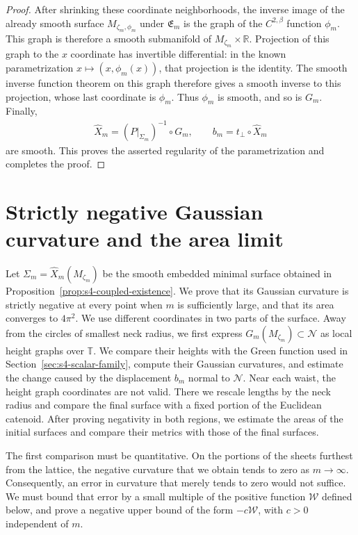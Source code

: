 \documentclass[a4paper,11pt,oneside,reqno]{amsart}
\numberwithin{equation}{section}
\theoremstyle{definition}
\begin{document}
\begin{proof}
    After shrinking these coordinate neighborhoods, the inverse
    image of the already smooth surface $M_{\zeta_m,\phi_m}$ under
    $\mathfrak E_m$ is the graph of the $C^{2,\beta}$ function
    $\phi_m$. This graph is therefore a smooth submanifold
    of $M_{\zeta_m}\times\mathbb R$.
    Projection of this graph to the $x$ coordinate has
    invertible differential: in the known parametrization
    $x\mapsto(x,\phi_m(x))$, that projection is the identity.
    The smooth inverse function theorem on this graph therefore
    gives a smooth inverse to this projection, whose last
    coordinate is $\phi_m$. Thus $\phi_m$ is smooth, and so
    is $G_m$. Finally,
    \begin{align*}
        \widehat X_m=(P|_{\Sigma_m})^{-1}\circ G_m,
        \qquad
        b_m=t_\perp\circ\widehat X_m
    \end{align*}
    are smooth. This proves the asserted regularity of the
    parametrization and completes the proof.
\end{proof}
%
\section{Strictly negative Gaussian curvature and the area limit}
\label{sec:s4-negative-curvature}

Let $\Sigma_m=\widehat X_m(M_{\zeta_m})$ be the smooth embedded
minimal surface obtained in
Proposition~\ref{prop:s4-coupled-existence}. We prove that its
Gaussian curvature is strictly negative at every point when $m$
is sufficiently large, and that its area converges to $4\pi^2$.
We use different coordinates in two parts of the surface.
Away from the circles of smallest neck radius, we first express
$G_m(M_{\zeta_m})\subset\mathcal N$ as local height graphs
over $\mathbb T$. We compare their heights with the Green
function used in Section~\ref{sec:s4-scalar-family}, compute
their Gaussian curvatures, and estimate the change caused by
the displacement $b_m$ normal to $\mathcal N$. Near each
waist, the height graph coordinates are
not valid. There we rescale lengths by the neck radius and
compare the final surface with a fixed portion of the
Euclidean catenoid. After proving negativity in both regions,
we estimate the areas of the initial surfaces and compare
their metrics with those of the final surfaces.

The first comparison must be quantitative. On the portions of
the sheets furthest from the lattice, the negative curvature
that we obtain tends to zero as $m\to\infty$. Consequently,
an error in curvature that merely tends to zero would not
suffice. We must bound that error by a small multiple of the
positive function $\mathcal W$ defined below, and prove a
negative upper bound of the form $-c\mathcal W$, with $c>0$
independent of $m$.
\end{document}
